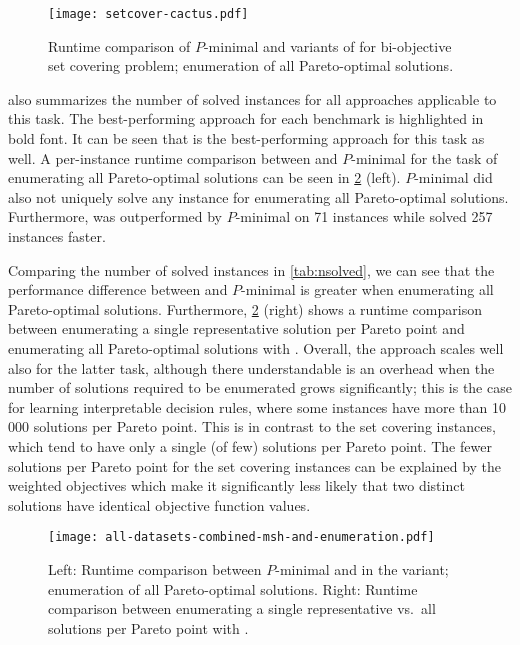 \begin{figure}
  \centering
  \texttt{[image: setcover-cactus.pdf]}
  \caption{Runtime comparison of $P$-minimal and variants of \algname{} for bi-objective set covering problem;
    enumeration of all Pareto-optimal solutions.
  }\label{fig:setcover-cactus-multi}
\end{figure}

 also summarizes the number of solved instances for all approaches applicable to this task.
The best-performing approach for each benchmark is highlighted in bold font.
It can be seen that \msh{} is the best-performing approach for this task as well.
A per-instance runtime comparison between \msh{} and $P$-minimal for the task of enumerating all Pareto-optimal solutions can be seen in \cref{fig:combined-msh-scatter-single-multi} (left).
$P$-minimal did also not uniquely solve any instance for enumerating all Pareto-optimal solutions.
Furthermore, \msh{} was outperformed by $P$-minimal on 71 instances while \msh{} solved 257 instances faster.

Comparing the number of solved instances in \cref{tab:nsolved}, we can see that the performance difference between \algname{} and $P$-minimal is greater when enumerating all Pareto-optimal solutions.
Furthermore, \cref{fig:combined-msh-scatter-single-multi} (right) shows a runtime comparison between enumerating a single representative solution per Pareto point and enumerating all Pareto-optimal solutions with \msh{}.
Overall, the approach scales well also for the latter task, although there understandable is an overhead when the number of solutions required to be enumerated grows significantly;
this is the case for learning interpretable decision rules, where some instances have more than 10\,000 solutions per Pareto point.
This is in contrast to the set covering instances, which tend to have only a single (of few) solutions per Pareto point.
The fewer solutions per Pareto point for the set covering instances can be explained by the weighted objectives which make it significantly less likely that two distinct solutions have identical objective function values.

\begin{figure}
  \centering
  \texttt{[image: all-datasets-combined-msh-and-enumeration.pdf]}
  \caption{Left: Runtime comparison between $P$-minimal and \algname{} in the \msh{} variant; 
    enumeration of all Pareto-optimal solutions.
    Right: Runtime comparison between enumerating a single representative vs.\ all solutions per Pareto point with \msh{}.}\label{fig:combined-msh-scatter-single-multi}
\end{figure}

